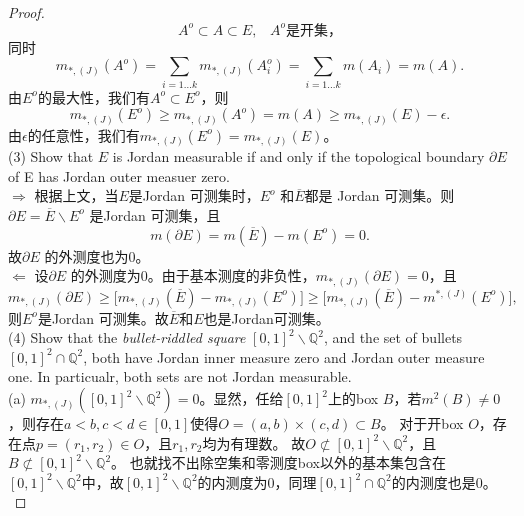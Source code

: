 \documentclass[reqno,a4paper,14pt]{amsart}
\begin{document}
\begin{proof}
\begin{equation*}
        A^o\subset A\subset E,\;\;\;A^o\text{是开集，}
    \end{equation*}
    同时
    \begin{equation*}
        m_{*,(J)}(A^o)= \sum_{i=1...k}m_{*,(J)}(A^o_i)=\sum_{i=1...k}m(A_i)=m(A).
    \end{equation*}
    由$E^o$的最大性，我们有$A^o\subset E^o$，则
    \begin{equation*}
        m_{*,(J)}(E^o)\geq m_{*,(J)}(A^o)=m(A)\geq m_{*,(J)}(E)-\epsilon.
    \end{equation*}
    由$\epsilon$的任意性，我们有$m_{*,(J)}(E^o)=m_{*,(J)}(E)$。\\
    (3) Show that $E$ is Jordan measurable if and only if the topological boundary $\partial E$ of E has Jordan outer measuer zero.\\
    \newline
    $\Rightarrow$ 根据上文，当$E$是Jordan 可测集时，$E^o$ 和$\overline{E}$都是 Jordan 可测集。则$\partial E=\overline{E}\backslash E^o$ 是Jordan 可测集，且
    \begin{equation*}
        m(\partial E)=m(\overline{E})-m(E^o)=0.
    \end{equation*}
    故$\partial E$ 的外测度也为0。\\
    $\Leftarrow$ 设$\partial E$ 的外测度为0。由于基本测度的非负性，$m_{*,(J)}(\partial E)=0$，且
    \begin{equation*}
        m_{*,(J)}(\partial E)\geq \biggl[ m_{*,(J)}(\overline{E})-m_{*,(J)}(E^o)\biggr]\geq \biggl[m_{*,(J)}(\overline{E})-m^{*,(J)}(E^o)\biggr],
    \end{equation*}
    则$E^o$是Jordan 可测集。故$\overline{E}$和$E$也是Jordan可测集。\\
    (4) Show that the \textit{bullet-riddled square} $[0,1]^2\backslash \mathbb{Q}^2$, and the set of bullets $[0,1]^2\cap\mathbb{Q}^2$, both have Jordan inner measure zero and Jordan outer measure one. In particualr, both sets are not Jordan measurable.\\
    \newline
    (a) $m_{*,(J)}([0,1]^2\backslash \mathbb{Q}^2)=0$。显然，任给$[0,1]^2$上的box $B$，若$m^2(B)\neq 0$，则存在$a<b,c<d\in [0,1]$使得$O=(a,b)\times (c,d)\subset B$。
    对于开box $O$，存在点$p=(r_1,r_2) \in O$，且$r_1,r_2$均为有理数。
    故$O\not\subset [0,1]^2\backslash \mathbb{Q}^2$，且$B\not\subset [0,1]^2\backslash \mathbb{Q}^2$。
    也就找不出除空集和零测度box以外的基本集包含在$[0,1]^2\backslash \mathbb{Q}^2$中，故$[0,1]^2\backslash \mathbb{Q}^2$的内测度为0，同理$[0,1]^2\cap\mathbb{Q}^2$的内测度也是0。\\

\end{proof}
\end{document}
